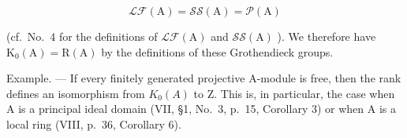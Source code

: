 \[
\mathscr {L} \mathscr {F} (\mathrm{A}) = \mathscr {S S} (\mathrm{A}) = \mathscr {P} (\mathrm{A})
\]

(cf.~No.~4 for the definitions of \(\mathcal{LF}(\mathrm{A})\) and \(\mathcal{SS}(\mathrm{A})\) ). We therefore have \(\mathrm{K}_0(\mathrm{A}) = \mathrm{R}(\mathrm{A})\) by the definitions of these Grothendieck groups.

Example. --- If every finitely generated projective A-module is free, then the rank defines an isomorphism from \(K_{0}(A)\) to Z. This is, in particular, the case when A is a principal ideal domain (VII, §1, No.~3, p.~15, Corollary 3) or when A is a local ring (VIII, p.~36, Corollary 6).

